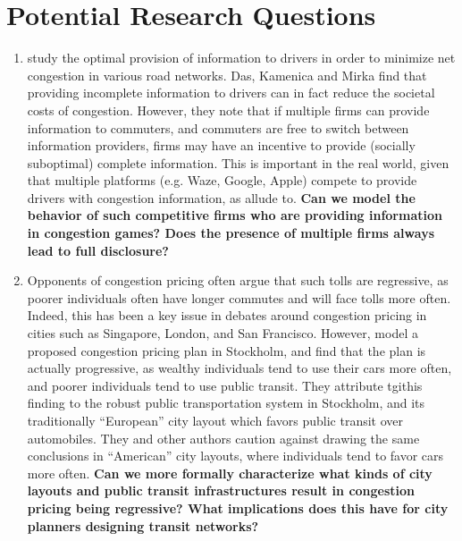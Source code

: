 \documentclass[JEL]{AEA}
\begin{document}

\section{Potential Research Questions}
\label{research-questions}

\begin{enumerate}
\item \cite{das-2017} study the optimal provision of information to drivers in order to minimize net congestion in various road networks. Das, Kamenica and Mirka find that providing incomplete information to drivers can in fact reduce the societal costs of congestion. However, they note that if multiple firms can provide information to commuters, and commuters are free to switch between information providers, firms may have an incentive to provide (socially suboptimal) complete information. This is important in the real world, given that multiple platforms (e.g. Waze, Google, Apple) compete to provide drivers with congestion information, as \cite{ostrovsky-2018} allude to. \textbf{Can we model the behavior of such competitive firms who are providing information in congestion games? Does the presence of multiple firms always lead to full disclosure?}

\item Opponents of congestion pricing often argue that such tolls are regressive, as poorer individuals often have longer commutes and will face tolls more often. Indeed, this has been a key issue in debates around congestion pricing in cities such as Singapore, London, and San Francisco. However, \cite{eliasson-2006} model a proposed congestion pricing plan in Stockholm, and find that the plan is actually progressive, as wealthy individuals tend to use their cars more often, and poorer individuals tend to use public transit. They attribute tgithis finding to the robust public transportation system in Stockholm, and its traditionally “European” city layout which favors public transit over automobiles. They and other authors caution against drawing the same conclusions in “American” city layouts, where individuals tend to favor cars more often. \textbf{Can we more formally characterize what kinds of city layouts and public transit infrastructures result in congestion pricing being regressive? What implications does this have for city planners designing transit networks?}


\end{enumerate}
\end{document}
